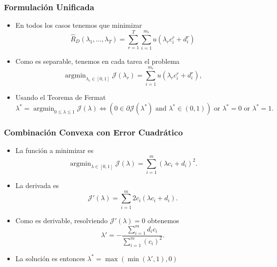 \documentclass[aspectratio=43]{beamer}
\DeclareMathOperator*{\argmin}{arg\min}
\newcommand{\opt}[1]{{#1}^*}
\newcommand{\ntasks}{T}
\newcommand{\npertask}{m}
\newcommand{\sample}{D}
\newcommand{\risk}{R}
\newcommand{\emprisk}{\hat{\risk}_{\sample}}
\begin{document}
\begin{frame}
      \frametitle{Formulación Unificada}

      \begin{itemize}
            \item En todos los casos tenemos que minimizar 
            \begin{equation}
                  \nonumber
                  \emprisk(\lambda_1, \ldots, \lambda_\ntasks) =
                  \sum_{r=1}^\ntasks \sum_{i=1}^{\npertask_r} u(\lambda_r c_i^r + d_i^r)
            \end{equation}
            \item Como es separable, tenemos en cada tarea el problema
            \begin{equation}
                  \nonumber
                  \argmin_{\lambda_r \in [0, 1]} \mathcal{J}(\lambda_r) = \sum_{i=1}^{\npertask_r} u(\lambda_r c_i^r + d_i^r),
            \end{equation}
            \item Usando el Teorema de Fermat
            \begin{equation}
                  \nonumber
                  \lambda^* = \argmin_{0 \leq \lambda \leq 1} \mathcal{J}(\lambda) \iff (0 \in \partial \mathcal{J}(\lambda^*) \text{ and } \lambda^* \in (0, 1) ) \text{ or } \lambda^*=0 \text{ or } \lambda^*=1 .
              \end{equation}
      \end{itemize}

\end{frame}


\begin{frame}
      \frametitle{Combinación Convexa con Error Cuadrático}

      \begin{itemize}
            \item La función a minimizar es 
            \begin{equation}
                  \nonumber
                  \argmin_{\lambda \in [0, 1]} \mathcal{J}(\lambda) = \sum_{i=1}^{\npertask} \left({\lambda c_i + d_i}\right)^2 .
            \end{equation}
            \item La derivada es
            \begin{equation}
                  \nonumber
                  \mathcal{J}'(\lambda) = \sum_{i=1}^\npertask 2 c_i (\lambda c_i + d_i) .
            \end{equation}
            \item Como es derivable, resolviendo $\mathcal{J}'(\lambda)= 0$ obtenemos
            \begin{equation*}
                  \lambda' =  -\frac{\sum_{i=1}^{\npertask} d_i c_i }{\sum_{i=1}^{\npertask} (c_i)^2 } .
                  \end{equation*}
            \item La solución es entonces $\opt{\lambda} = \max(\min(\lambda', 1), 0)$
      \end{itemize}
        
\end{frame}
\end{document}
